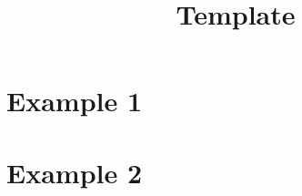 

\title{Template} %



\maketitle

\pagebreak
\tableofcontents

\pagebreak
\section{Example 1}


\pagebreak
\section{Example 2}


